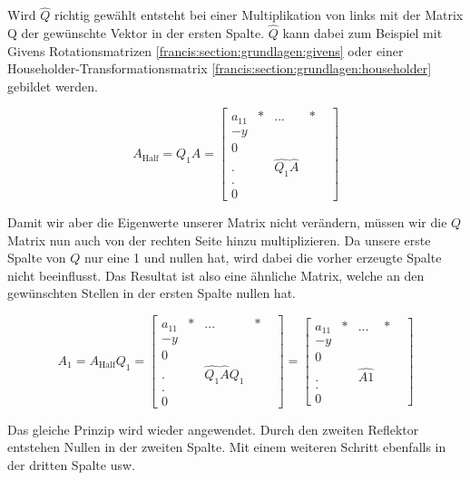 Wird $\hat{Q}$ richtig gewählt entsteht bei einer Multiplikation von links mit der Matrix Q der gewünschte Vektor in der ersten Spalte.
$\hat{Q}$ kann dabei zum Beispiel mit Givens Rotationsmatrizen \ref{francis:section:grundlagen:givens} oder einer Householder-Transformationsmatrix \ref{francis:section:grundlagen:householder} gebildet werden.

\begin{equation}
	A_{\text{Half}}=Q_{1}A=
	\begin{bmatrix}
	a_{11} & * & ... & *\\
	-y & \\
	0 & & & &\\
	. & &\hat{Q_1}\hat{A} & &\\
	. & & & &\\
	0 & & & &
	\end{bmatrix}
\end{equation}

Damit wir aber die Eigenwerte unserer Matrix nicht verändern, müssen wir die $Q$ Matrix nun auch von der rechten Seite hinzu multiplizieren.
Da unsere erste Spalte von $Q$ nur eine 1 und nullen hat, wird dabei die vorher erzeugte Spalte nicht beeinflusst.
Das Resultat ist also eine ähnliche Matrix, welche an den gewünschten Stellen in der ersten Spalte nullen hat.

\begin{equation}
	A_{1}=A_{\text{Half}}Q_{1}=
	\begin{bmatrix}
	a_{11} & * & ... & *\\
	-y & \\
	0 & & & &\\
	. & &\hat{Q_1}\hat{A}\hat{Q_1} & &\\
	. & & & &\\
	0 & & & &
	\end{bmatrix}
	=
	\begin{bmatrix}
	a_{11} & * & ... & *\\
	-y & \\
	0 & & & &\\
	. & &\hat{A1} & &\\
	. & & & &\\
	0 & & & &
	\end{bmatrix}
\end{equation}	

Das gleiche Prinzip wird wieder angewendet.
Durch den zweiten Reflektor entstehen Nullen in der zweiten Spalte.
Mit einem weiteren Schritt ebenfalls in der dritten Spalte usw.

